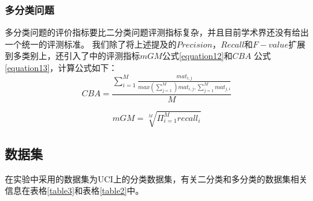 \documentclass{article}
\begin{document}
\subsubsection{多分类问题}
多分类问题的评价指标要比二分类问题评测指标复杂，并且目前学术界还没有给出一个统一的评测标准。
我们除了将上述提及的$Precision$，$Recall$和$F-value$扩展到多类别上，还引入了\cite{2017Relevance}中的评测指标$mGM$公式\ref{equation12}和$CBA$ 公式\ref{equation13}，计算公式如下：
\begin{equation}
  \label{equation12}
  CBA=\frac{\sum_{i=1}^{M}\frac{mat_{i,j}}{max(\sum_{j=1}^M)mat_{i,j},\sum_{j=1}^M mat_{j,i}}}{M}
\end{equation}

\begin{equation}
  \label{equation13}
  mGM=\sqrt[M]{\Pi_{i=1}^M recall_{i}}
\end{equation}
\subsection{数据集}
在实验中采用的数据集为UCI上的分类数据集，有关二分类和多分类的数据集相关信息在表格\ref{table3}和表格\ref{table2}中。


\end{document}
